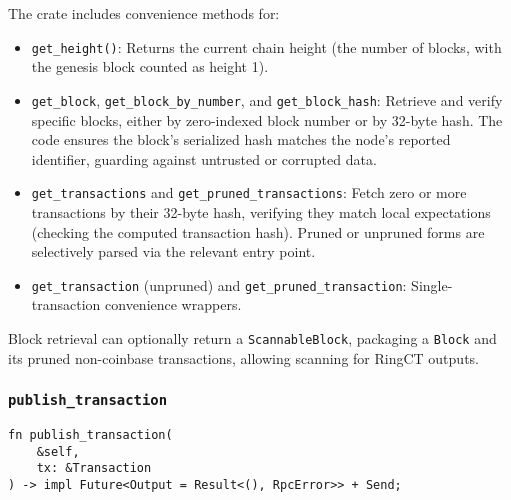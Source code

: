 The crate includes convenience methods for:
\begin{itemize}
    \item \texttt{get\_height()}: Returns the current chain height (the number
    of blocks, with the genesis block counted as height 1). %
    \item \texttt{get\_block}, \texttt{get\_block\_by\_number}, and
    \texttt{get\_block\_hash}: Retrieve and verify specific blocks, either by
    zero-indexed block number or by 32-byte hash.  The code ensures the block’s
    serialized hash matches the node’s reported identifier, guarding against
    untrusted or corrupted data. %
    \item \texttt{get\_transactions} and \texttt{get\_pruned\_transactions}: %
    Fetch zero or more transactions by their 32-byte hash, verifying they match
    local expectations (checking the computed transaction hash).  Pruned or
    unpruned forms are selectively parsed via the relevant entry point.
    \item \texttt{get\_transaction} (unpruned) and
    \texttt{get\_pruned\_transaction}: Single-transaction convenience wrappers. %
\end{itemize}

Block retrieval can optionally return a \texttt{ScannableBlock}, packaging a
\texttt{Block} and its pruned non-coinbase transactions, allowing scanning for
RingCT outputs. %

\subsubsection{\texttt{publish\_transaction}}
\label{sec:monero-rpc-rpc-trait-publish}

\begin{verbatim}
fn publish_transaction(
    &self,
    tx: &Transaction
) -> impl Future<Output = Result<(), RpcError>> + Send;
\end{verbatim}


